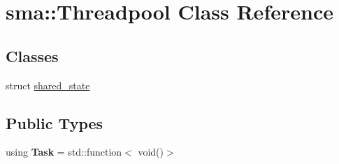 \hypertarget{classsma_1_1Threadpool}{\section{sma\-:\-:Threadpool Class Reference}
\label{classsma_1_1Threadpool}
}
\subsection*{Classes}
\begin{DoxyCompactItemize}
\item 
struct \hyperlink{structsma_1_1Threadpool_1_1shared__state}{shared\-\_\-state}
\end{DoxyCompactItemize}
\subsection*{Public Types}
\begin{DoxyCompactItemize}
\item 
\hypertarget{classsma_1_1Threadpool_abc873b5dcb09da29caa757bfeae1fad4}{using {\bfseries Task} = std\-::function$<$ void()$>$}\label{classsma_1_1Threadpool_abc873b5dcb09da29caa757bfeae1fad4}

\end{DoxyCompactItemize}
